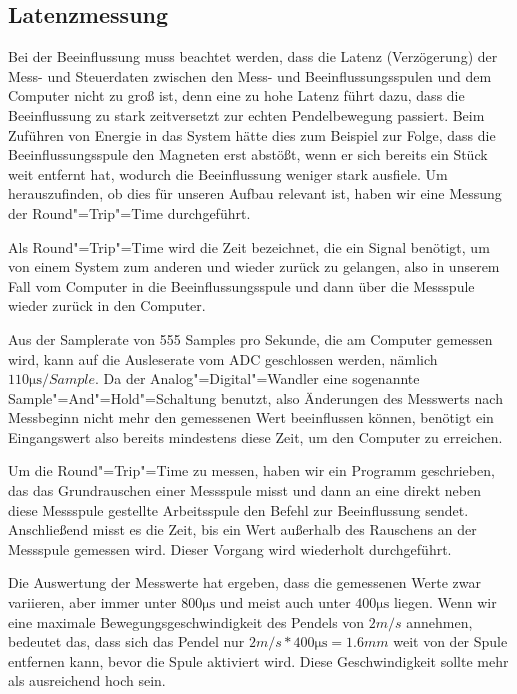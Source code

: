 \subsection{Latenzmessung}

Bei der Beeinflussung muss beachtet werden, dass die Latenz (Verzögerung) der Mess- und Steuerdaten zwischen den Mess- und Beeinflussungsspulen
und dem Computer nicht zu groß ist, denn eine zu hohe Latenz führt dazu, dass die Beeinflussung zu stark zeitversetzt zur echten Pendelbewegung
passiert.
Beim Zuführen von Energie in das System hätte dies zum Beispiel zur Folge, dass die Beeinflussungsspule den Magneten erst abstößt, wenn er sich bereits ein Stück weit entfernt hat, wodurch die Beeinflussung weniger stark ausfiele.
Um herauszufinden, ob dies für unseren Aufbau relevant ist, haben wir eine Messung der Round"=Trip"=Time durchgeführt.

Als Round"=Trip"=Time wird die Zeit bezeichnet, die ein Signal benötigt, um von einem System zum anderen und wieder zurück zu gelangen, also in
unserem Fall vom Computer in die Beeinflussungsspule und dann über die Messspule wieder zurück in den Computer.

Aus der Samplerate von 555 Samples pro Sekunde, die am Computer gemessen wird, kann auf die Ausleserate vom ADC geschlossen werden, nämlich $110 \si{\us} / Sample$. Da der Analog"=Digital"=Wandler eine sogenannte Sample"=And"=Hold"=Schaltung benutzt, also Änderungen des Messwerts nach
Messbeginn nicht mehr den gemessenen Wert beeinflussen können, benötigt ein Eingangswert also bereits mindestens diese Zeit, um den Computer
zu erreichen.

Um die Round"=Trip"=Time zu messen, haben wir ein Programm geschrieben, das das Grundrauschen einer Messspule misst und dann an eine direkt
neben diese Messspule gestellte Arbeitsspule den Befehl zur Beeinflussung sendet.
Anschließend misst es die Zeit, bis ein Wert außerhalb des Rauschens an der Messspule gemessen wird. Dieser Vorgang wird wiederholt durchgeführt.

Die Auswertung der Messwerte hat ergeben, dass die gemessenen Werte zwar variieren, aber immer unter $800 \si{\us}$ und meist auch unter $400 \si{\us}$ liegen. Wenn wir eine maximale Bewegungsgeschwindigkeit des Pendels von $2 \si{m/s}$ annehmen, bedeutet das, dass sich das Pendel nur
$2 \si{m/s} * 400 \si{\us} = 1.6 \si{mm}$ weit von der Spule entfernen kann, bevor die Spule aktiviert wird. Diese Geschwindigkeit sollte mehr als ausreichend hoch sein.

